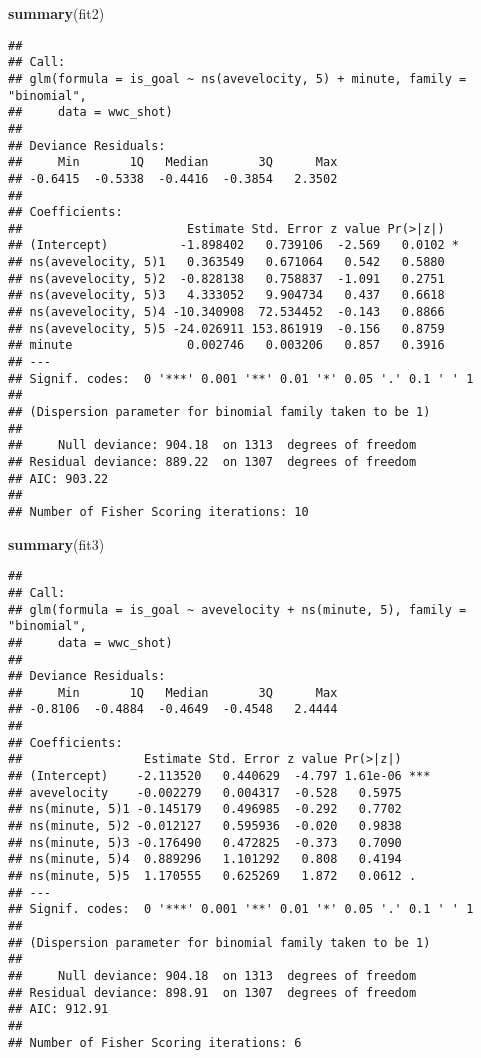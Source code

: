 \documentclass[]{article}
\newenvironment{Shaded}{\begin{snugshade}}{\end{snugshade}}
\newcommand{\KeywordTok}[1]{\textcolor[rgb]{0.13,0.29,0.53}{\textbf{#1}}}
\newcommand{\NormalTok}[1]{#1}
\begin{document}
\begin{Shaded}
\begin{Highlighting}[]
\KeywordTok{summary}\NormalTok{(fit2)}
\end{Highlighting}
\end{Shaded}

\begin{verbatim}
## 
## Call:
## glm(formula = is_goal ~ ns(avevelocity, 5) + minute, family = "binomial", 
##     data = wwc_shot)
## 
## Deviance Residuals: 
##     Min       1Q   Median       3Q      Max  
## -0.6415  -0.5338  -0.4416  -0.3854   2.3502  
## 
## Coefficients:
##                       Estimate Std. Error z value Pr(>|z|)  
## (Intercept)          -1.898402   0.739106  -2.569   0.0102 *
## ns(avevelocity, 5)1   0.363549   0.671064   0.542   0.5880  
## ns(avevelocity, 5)2  -0.828138   0.758837  -1.091   0.2751  
## ns(avevelocity, 5)3   4.333052   9.904734   0.437   0.6618  
## ns(avevelocity, 5)4 -10.340908  72.534452  -0.143   0.8866  
## ns(avevelocity, 5)5 -24.026911 153.861919  -0.156   0.8759  
## minute                0.002746   0.003206   0.857   0.3916  
## ---
## Signif. codes:  0 '***' 0.001 '**' 0.01 '*' 0.05 '.' 0.1 ' ' 1
## 
## (Dispersion parameter for binomial family taken to be 1)
## 
##     Null deviance: 904.18  on 1313  degrees of freedom
## Residual deviance: 889.22  on 1307  degrees of freedom
## AIC: 903.22
## 
## Number of Fisher Scoring iterations: 10
\end{verbatim}

\begin{Shaded}
\begin{Highlighting}[]
\KeywordTok{summary}\NormalTok{(fit3)}
\end{Highlighting}
\end{Shaded}

\begin{verbatim}
## 
## Call:
## glm(formula = is_goal ~ avevelocity + ns(minute, 5), family = "binomial", 
##     data = wwc_shot)
## 
## Deviance Residuals: 
##     Min       1Q   Median       3Q      Max  
## -0.8106  -0.4884  -0.4649  -0.4548   2.4444  
## 
## Coefficients:
##                 Estimate Std. Error z value Pr(>|z|)    
## (Intercept)    -2.113520   0.440629  -4.797 1.61e-06 ***
## avevelocity    -0.002279   0.004317  -0.528   0.5975    
## ns(minute, 5)1 -0.145179   0.496985  -0.292   0.7702    
## ns(minute, 5)2 -0.012127   0.595936  -0.020   0.9838    
## ns(minute, 5)3 -0.176490   0.472825  -0.373   0.7090    
## ns(minute, 5)4  0.889296   1.101292   0.808   0.4194    
## ns(minute, 5)5  1.170555   0.625269   1.872   0.0612 .  
## ---
## Signif. codes:  0 '***' 0.001 '**' 0.01 '*' 0.05 '.' 0.1 ' ' 1
## 
## (Dispersion parameter for binomial family taken to be 1)
## 
##     Null deviance: 904.18  on 1313  degrees of freedom
## Residual deviance: 898.91  on 1307  degrees of freedom
## AIC: 912.91
## 
## Number of Fisher Scoring iterations: 6
\end{verbatim}
\end{document}
